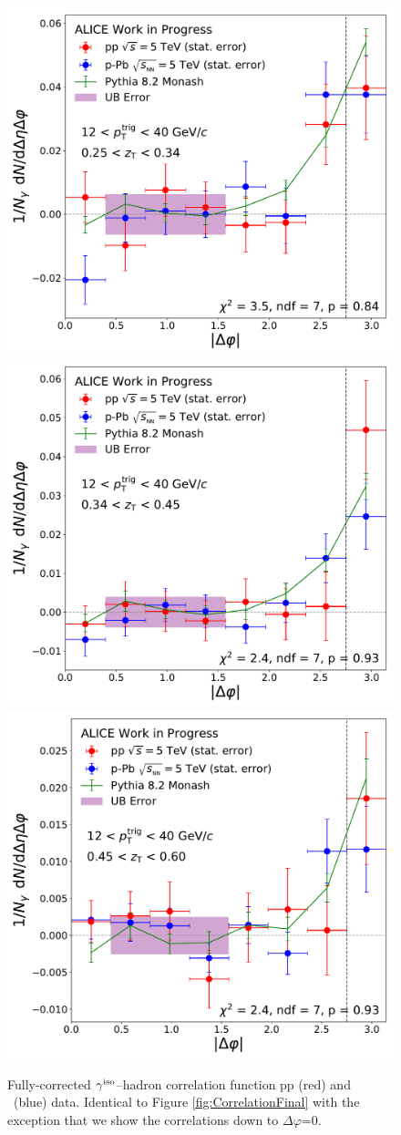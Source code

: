 \begin{figure}
\includegraphics[width = 0.24 \textwidth]{G-H_New/dPhi_to_0/Cs_Final_Indv_pT_0_zT_5.pdf}
\includegraphics[width = 0.24 \textwidth]{G-H_New/dPhi_to_0/Cs_Final_Indv_pT_0_zT_6.pdf}
\includegraphics[width = 0.24 \textwidth]{G-H_New/dPhi_to_0/Cs_Final_Indv_pT_0_zT_7.pdf}
\caption{Fully-corrected $\gamma^\mathrm{iso}$--hadron correlation function pp (red) and \pPb~(blue) data. Identical to Figure \ref{fig:CorrelationFinal} with the exception that we show the correlations down to $\Delta\varphi$=0. }
\label{fig:CorrelationFinal_downtozero}
\end{figure}



